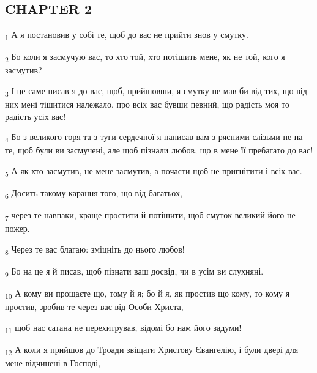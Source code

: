 \subsection{CHAPTER 2}
\begin{tcolorbox}
\textsubscript{1} А я постановив у собі те, щоб до вас не прийти знов у смутку.
\end{tcolorbox}
\begin{tcolorbox}
\textsubscript{2} Бо коли я засмучую вас, то хто той, хто потішить мене, як не той, кого я засмутив?
\end{tcolorbox}
\begin{tcolorbox}
\textsubscript{3} І це саме писав я до вас, щоб, прийшовши, я смутку не мав би від тих, що від них мені тішитися належало, про всіх вас бувши певний, що радість моя то радість усіх вас!
\end{tcolorbox}
\begin{tcolorbox}
\textsubscript{4} Бо з великого горя та з туги сердечної я написав вам з рясними слізьми не на те, щоб були ви засмучені, але щоб пізнали любов, що в мене її пребагато до вас!
\end{tcolorbox}
\begin{tcolorbox}
\textsubscript{5} А як хто засмутив, не мене засмутив, а почасти щоб не пригнітити і всіх вас.
\end{tcolorbox}
\begin{tcolorbox}
\textsubscript{6} Досить такому карання того, що від багатьох,
\end{tcolorbox}
\begin{tcolorbox}
\textsubscript{7} через те навпаки, краще простити й потішити, щоб смуток великий його не пожер.
\end{tcolorbox}
\begin{tcolorbox}
\textsubscript{8} Через те вас благаю: зміцніть до нього любов!
\end{tcolorbox}
\begin{tcolorbox}
\textsubscript{9} Бо на це я й писав, щоб пізнати ваш досвід, чи в усім ви слухняні.
\end{tcolorbox}
\begin{tcolorbox}
\textsubscript{10} А кому ви прощаєте що, тому й я; бо й я, як простив що кому, то кому я простив, зробив те через вас від Особи Христа,
\end{tcolorbox}
\begin{tcolorbox}
\textsubscript{11} щоб нас сатана не перехитрував, відомі бо нам його задуми!
\end{tcolorbox}
\begin{tcolorbox}
\textsubscript{12} А коли я прийшов до Троади звіщати Христову Євангелію, і були двері для мене відчинені в Господі,
\end{tcolorbox}
